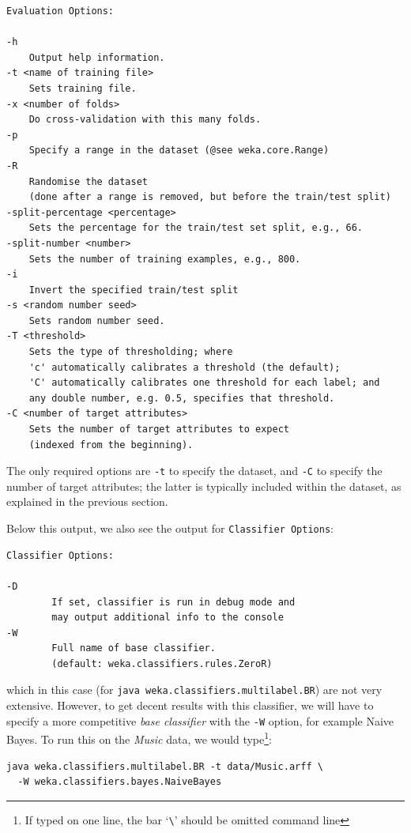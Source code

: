 \documentclass[11pt]{article}
\begin{document}
{\small
\begin{verbatim}
Evaluation Options:

-h
    Output help information.
-t <name of training file>
    Sets training file.
-x <number of folds>
    Do cross-validation with this many folds.
-p
    Specify a range in the dataset (@see weka.core.Range)
-R
    Randomise the dataset 
    (done after a range is removed, but before the train/test split)
-split-percentage <percentage>
    Sets the percentage for the train/test set split, e.g., 66.
-split-number <number>
    Sets the number of training examples, e.g., 800.
-i
    Invert the specified train/test split
-s <random number seed>
    Sets random number seed.
-T <threshold>
    Sets the type of thresholding; where 
    'c' automatically calibrates a threshold (the default); 
    'C' automatically calibrates one threshold for each label; and 
    any double number, e.g. 0.5, specifies that threshold.
-C <number of target attributes>
    Sets the number of target attributes to expect 
    (indexed from the beginning).
\end{verbatim}
}

The only required options are \texttt{-t} to specify the dataset, and \texttt{-C} to specify the number of target attributes; the latter is typically included within the dataset, as explained in the previous section. 

Below this output, we also see the output for \texttt{Classifier Options}:

{\small
\begin{verbatim}
Classifier Options:

-D
        If set, classifier is run in debug mode and
        may output additional info to the console
-W
        Full name of base classifier.
        (default: weka.classifiers.rules.ZeroR)
\end{verbatim}
}

which in this case (for \texttt{java weka.classifiers.multilabel.BR}) are not very extensive. However, to get decent results with this classifier, we will have to specify a more competitive \emph{base classifier} with the \texttt{-W} option, for example Naive Bayes. To run this on the \textit{Music} data, we would type\footnote{If typed on one line, the bar `\texttt{\textbackslash}' should be omitted command line}:

\begin{verbatim}
java weka.classifiers.multilabel.BR -t data/Music.arff \
  -W weka.classifiers.bayes.NaiveBayes
\end{verbatim}
\end{document}
